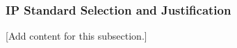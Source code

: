 
\subsubsection{IP Standard Selection and Justification}
\label{subsubsec:design_2_7_1_ip_standard_selection_justification}

[Add content for this subsection.]
